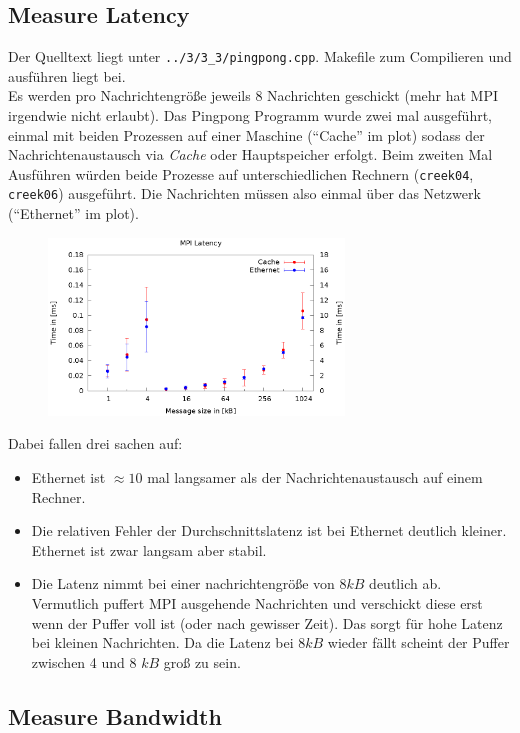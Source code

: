 \documentclass[a4paper,11pt]{scrartcl}
\begin{document}
\subsection{Measure Latency}

Der Quelltext liegt unter \verb+../3/3_3/pingpong.cpp+. Makefile zum Compilieren und ausführen liegt bei. \\

Es werden pro Nachrichtengröße jeweils 8 Nachrichten geschickt (mehr hat MPI irgendwie nicht erlaubt). Das Pingpong Programm wurde zwei mal ausgeführt, einmal mit beiden Prozessen auf einer Maschine ("`Cache"' im plot) sodass der Nachrichtenaustausch via \emph{Cache} oder Hauptspeicher erfolgt. Beim zweiten Mal Ausführen würden beide Prozesse auf unterschiedlichen Rechnern (\verb+creek04+, \verb+creek06+) ausgeführt. Die Nachrichten müssen also einmal über das Netzwerk ("`Ethernet"' im plot).\\

\begin{figure}[!ht]
\centering
\includegraphics[width=0.7\textwidth,keepaspectratio]{3_3/data/plot.eps}
\end{figure}

Dabei fallen drei sachen auf: 

\begin{itemize}
    \item Ethernet ist $\approx 10$ mal langsamer als der Nachrichtenaustausch auf einem Rechner.
    \item Die relativen Fehler der Durchschnittslatenz ist bei Ethernet deutlich kleiner. Ethernet ist zwar langsam aber stabil.
    \item Die Latenz nimmt bei einer nachrichtengröße von $8kB$ deutlich ab. Vermutlich puffert MPI ausgehende Nachrichten und verschickt diese erst wenn der Puffer voll ist (oder nach gewisser Zeit). Das sorgt für hohe Latenz bei kleinen Nachrichten. Da die Latenz bei $8kB$ wieder fällt scheint der Puffer zwischen 4 und 8 $kB$ groß zu sein.
\end{itemize}





\subsection{Measure Bandwidth}
\end{document}
